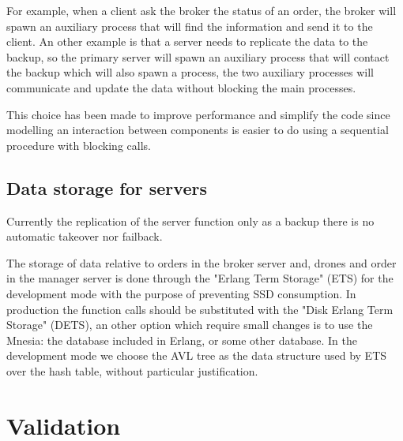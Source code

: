 \documentclass[a4paper, oneside]{memoir}
\begin{document}
For example, when a client ask the broker the status of an order, the broker will spawn an auxiliary process that will find the information and send it to the client.
An other example is that a server needs to replicate the data to the backup, so the primary server will spawn an auxiliary process that will contact the backup which will also spawn a process, the two auxiliary processes will communicate and update the data without blocking the main processes.

This choice has been made to improve performance and simplify the code since modelling an interaction between components is easier to do using a sequential procedure with blocking calls.

\section{Data storage for servers}
Currently the replication of the server function only as a backup there is no automatic takeover nor failback.

The storage of data relative to orders in the broker server and, drones and order in the manager server is done through the "Erlang Term Storage" (ETS) for the development mode with the purpose of preventing SSD consumption. In production the function calls should be substituted with the "Disk Erlang Term Storage" (DETS), an other option which require small changes is to use the Mnesia: the database included in Erlang, or some other database. In the development mode we choose the AVL tree as the data structure used by ETS over the hash table, without particular justification.

\chapter{Validation}
\end{document}
